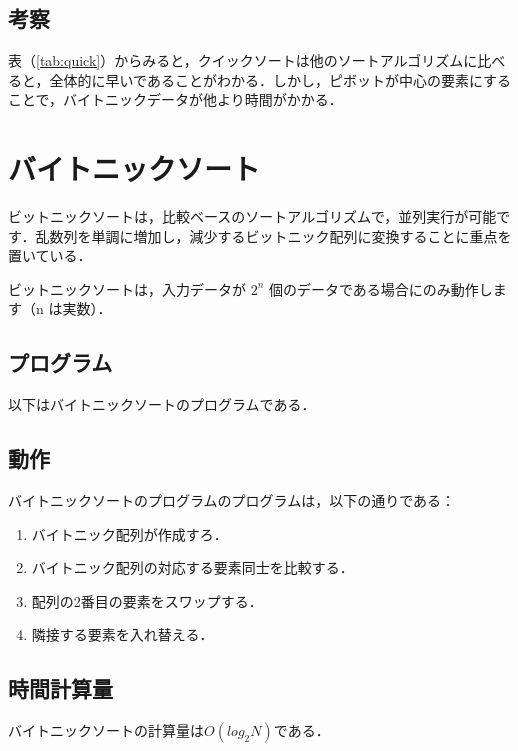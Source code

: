 \documentclass[a4j, titlepage]{jarticle}
\begin{document}
        
        \subsection{考察}
            表（\ref{tab:quick}）からみると，クイックソートは他のソートアルゴリズムに比べると，全体的に早いであることがわかる．しかし，ピボットが中心の要素にすることで，バイトニックデータが他より時間がかかる．

    \section{バイトニックソート}
        ビットニックソートは，比較ベースのソートアルゴリズムで，並列実行が可能です．乱数列を単調に増加し，減少するビットニック配列に変換することに重点を置いている．

        ビットニックソートは，入力データが $2^n$ 個のデータである場合にのみ動作します（n は実数）．
        
        \subsection{プログラム}
            以下はバイトニックソートのプログラムである．
            

        \subsection{動作}
            バイトニックソートのプログラムのプログラムは，以下の通りである：
                \begin{screen}
                    \begin{enumerate}
                        \item バイトニック配列が作成すろ．
                        \item バイトニック配列の対応する要素同士を比較する．
                        \item 配列の2番目の要素をスワップする．
                        \item 隣接する要素を入れ替える．
                    \end{enumerate}
                \end{screen}
        
        \subsection{時間計算量}
            バイトニックソートの計算量は$O(log_2N)$である．
\end{document}
